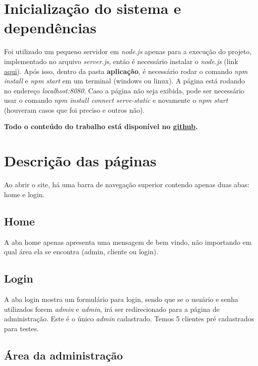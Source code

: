 \documentclass[10pt,a4paper]{article}
\begin{document}
\section{Inicialização do sistema e dependências}
Foi utilizado um pequeno servidor em \textit{node.js} apenas para a execução do projeto, implementado no arquivo \textit{server.js}, então é necessário instalar o \textit{node.js} (link \href{https://nodejs.org/en/}{aqui}). Após isso, dentro da pasta \textbf{aplicação}, é necessário rodar o comando \textit{npm install} e \textit{npm start} em um terminal (windows ou linux). A página está rodando no endereço \textit{localhost:8080}. Caso a página não seja exibida, pode ser necessário usar o comando \textit{npm install connect serve-static} e novamente o \textit{npm start} (houveram casos que foi preciso e outros não).

\textbf{Todo o conteúdo do trabalho está disponível no \href{https://github.com/Adams123/Web2017}{github}.}

\section{Descrição das páginas}
Ao abrir o site, há uma barra de navegação superior contendo apenas duas abas: home e login.
\subsection{Home}
A aba home apenas apresenta uma mensagem de bem vindo, não importando em qual área ela se encontra (admin, cliente ou login).
\subsection{Login}
A aba login mostra um formulário para login, sendo que se o usuário e senha utilizados forem \textit{admin} e \textit{admin}, irá ser redirecionado para a página de administração. Este é o único \textit{admin} cadastrado. Temos 5 clientes pré cadastrados para testes.
\subsection{Área da administração}
\end{document}
